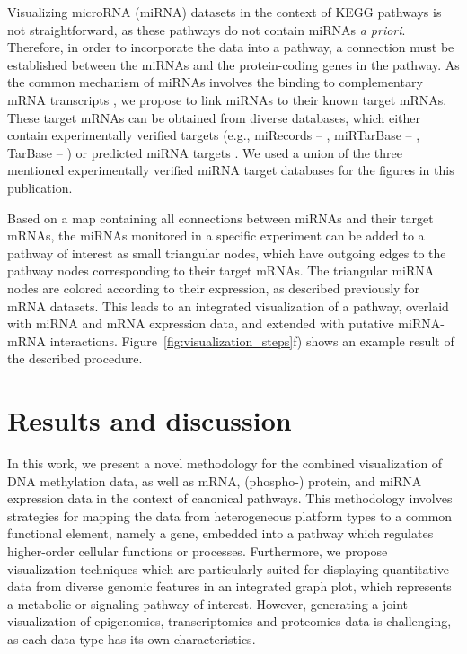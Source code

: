 \documentclass{bioinfo}
\begin{document}
Visualizing microRNA (miRNA) datasets in the context of KEGG pathways is not straightforward, as
these pathways do not contain miRNAs \emph{a priori}. Therefore, in order to incorporate the data into a
pathway, a connection must be established between the miRNAs and the protein-coding genes
in the pathway. As the common mechanism of miRNAs involves the binding to complementary mRNA
transcripts \citep{Bartel2004}, we propose to link miRNAs to their known target mRNAs. These target
mRNAs can be obtained from diverse databases, which either contain experimentally verified targets
(e.g., miRecords -- \citealp{miRecords}, miRTarBase -- \citealp{miRTarBase}, TarBase --
\citealp{TarBase}) or predicted miRNA targets \citep[reviewed in][]{Alexiou2009}.
We used a union of the three mentioned experimentally verified miRNA target databases for the
figures in this publication.


Based on a map containing all connections between miRNAs and their target mRNAs, the miRNAs
monitored in a specific experiment can be added to a pathway of interest as small triangular nodes,
which have outgoing edges to the pathway nodes corresponding to their target mRNAs. The triangular
miRNA nodes are colored according to their expression, as described previously for mRNA datasets.
This leads to an integrated visualization of a pathway, overlaid with miRNA and mRNA expression
data, and extended with putative miRNA-mRNA interactions. Figure~\ref{fig:visualization_steps}f)
shows an example result of the described procedure.


\section{Results and discussion}

In this work, we present a novel methodology for the combined visualization of DNA methylation data,
as well as mRNA, (phospho-) protein, and miRNA expression data in the context of canonical pathways.
This methodology involves strategies for mapping the data from heterogeneous platform types to a common
functional element, namely a gene, embedded into a pathway which regulates higher-order cellular
functions or processes. Furthermore, we propose visualization techniques which are particularly suited for
displaying quantitative data from diverse genomic features in an integrated graph plot,
which represents a metabolic or signaling pathway of interest. However, generating a joint visualization of
epigenomics, transcriptomics and proteomics data is challenging, as each data type has
its own characteristics.
\end{document}
